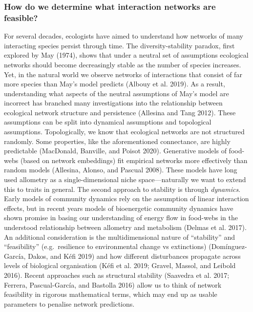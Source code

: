 \documentclass[11pt]{article}
\begin{document}
\hypertarget{how-do-we-determine-what-interaction-networks-are-feasible}{%
\subsubsection{How do we determine what interaction networks are
feasible?}\label{how-do-we-determine-what-interaction-networks-are-feasible}}

For several decades, ecologists have aimed to understand how networks of
many interacting species persist through time. The diversity-stability
paradox, first explored by May (1974), shows that under a neutral set of
assumptions ecological networks should become decreasingly stable as the
number of species increases. Yet, in the natural world we observe
networks of interactions that consist of far more species than May's
model predicts (Albouy et al. 2019). As a result, understanding what
aspects of the neutral assumptions of May's model are incorrect has
branched many investigations into the relationship between ecological
network structure and persistence (Allesina and Tang 2012). These
assumptions can be split into dynamical assumptions and topological
assumptions. Topologically, we know that ecological networks are not
structured randomly. Some properties, like the aforementioned
connectance, are highly predictable (MacDonald, Banville, and Poisot
2020). Generative models of food-webs (based on network embeddings) fit
empirical networks more effectively than random models (Allesina,
Alonso, and Pascual 2008). These models have long used allometry as a
single-dimensional niche space---naturally we want to extend this to
traits in general. The second approach to stability is through
\emph{dynamics}. Early models of community dynamics rely on the
assumption of linear interaction effects, but in recent years models of
bioenergetic community dynamics have shown promise in basing our
understanding of energy flow in food-webs in the understood relationship
between allometry and metabolism (Delmas et al. 2017). An additional
consideration is the multidimensional nature of ``stability'' and
``feasibility'' (e.g.~resilience to environmental change vs extinctions)
(Domínguez-García, Dakos, and Kéfi 2019) and how different disturbances
propagate across levels of biological organisation (Kéfi et al. 2019;
Gravel, Massol, and Leibold 2016). Recent approaches such as structural
stability (Saavedra et al. 2017; Ferrera, Pascual-García, and Bastolla
2016) allow us to think of network feasibility in rigorous mathematical
terms, which may end up as usable parameters to penalise network
predictions.
\end{document}
